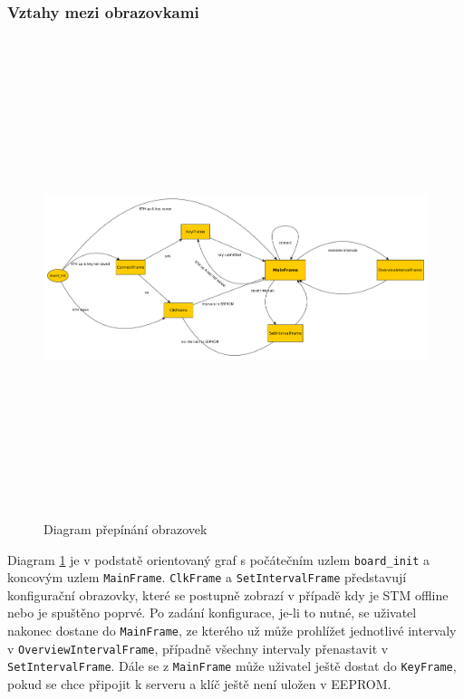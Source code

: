 \subsubsection{Vztahy mezi obrazovkami}

\begin{figure}[H]\centering
\includegraphics[width=140mm, height=140mm]{../diagrams/frame_diagram.pdf}
\caption{Diagram přepínání obrazovek}
\label{frame-diagram}
\end{figure}

Diagram \ref{frame-diagram} je v podstatě orientovaný graf s počátečním uzlem \texttt{board\_init}
a koncovým uzlem \texttt{MainFrame}.
\texttt{ClkFrame} a \texttt{SetIntervalFrame} představují konfigurační obrazovky, které se postupně
zobrazí v případě kdy je STM offline nebo je spuštěno poprvé.
Po zadání konfigurace, je-li to nutné, se uživatel nakonec dostane do \texttt{MainFrame}, ze kterého
už může prohlížet jednotlivé intervaly v \texttt{OverviewIntervalFrame}, případně všechny intervaly
přenastavit v \texttt{SetIntervalFrame}.
Dále se z \texttt{MainFrame} může uživatel ještě dostat do \texttt{KeyFrame}, pokud se chce připojit
k serveru a klíč ještě není uložen v EEPROM.

